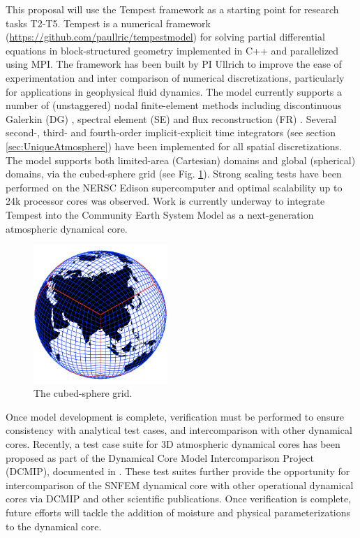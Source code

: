 \documentclass[11pt]{article}
\begin{document}
This proposal will use the Tempest framework \cite{ullrich2014global} as a starting point for research tasks T2-T5.  Tempest is a numerical framework (\url{https://github.com/paullric/tempestmodel}) \citep{ullrich2014global} for solving partial differential equations in block-structured geometry implemented in C++ and parallelized using MPI.  The framework has been built by PI Ullrich to improve the ease of experimentation and inter comparison of numerical discretizations, particularly for applications in geophysical fluid dynamics.  The model currently supports a number of (unstaggered) nodal finite-element methods including discontinuous Galerkin (DG) \citep{cockburn2000development}, spectral element (SE) \citep{maday1989spectral} and flux reconstruction (FR) \citep{huynh2007flux}.  Several second-, third- and fourth-order implicit-explicit time integrators (see section \ref{sec:UniqueAtmosphere}) have been implemented for all spatial discretizations.  The model supports both limited-area (Cartesian) domains and global (spherical) domains, via the cubed-sphere grid (see Fig. \ref{fig:CubedSphere}).  Strong scaling tests have been performed on the NERSC Edison supercomputer and optimal scalability up to 24k processor cores was observed.  Work is currently underway to integrate Tempest into the Community Earth System Model \citep{JWHetal2013BAMS} as a next-generation atmospheric dynamical core.

\begin{figure}
\begin{center}
\includegraphics[width=2in]{A_CubedSphere}
\end{center}
\caption{The cubed-sphere grid.} \label{fig:CubedSphere}
\end{figure}

Once model development is complete, verification must be performed to ensure consistency with analytical test cases, and intercomparison with other dynamical cores.  Recently, a test case suite for 3D atmospheric dynamical cores has been proposed as part of the Dynamical Core Model Intercomparison Project (DCMIP), documented in \cite{DCMIP2012TESTCASES, JKPAUCJ2012QJRMS}.  These test suites further provide the opportunity for intercomparison of the SNFEM dynamical core with other operational dynamical cores via DCMIP and other scientific publications.  Once verification is complete, future efforts will tackle the addition of moisture and physical parameterizations to the dynamical core.
\end{document}
